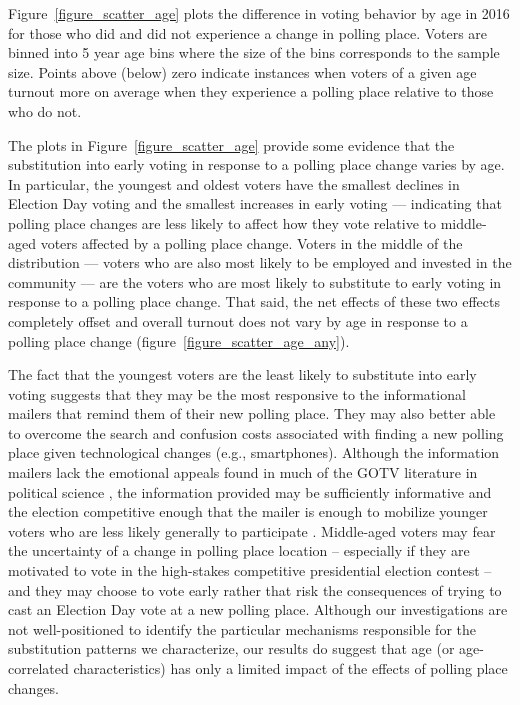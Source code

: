 \documentclass{cup_PSRM}
\begin{document}
Figure~\ref{figure_scatter_age} plots the difference in voting behavior by age in 2016 for those who did and did not experience a change in polling place.   Voters are binned into 5 year age bins where the size of the bins corresponds to the sample size.  Points above (below) zero indicate instances when voters of a given age turnout more on average when they experience a polling place relative to those who do not.

The plots in Figure~\ref{figure_scatter_age} provide some evidence that the substitution into early voting in response to a polling place change varies by age.  In particular, the youngest and oldest voters have the smallest declines in Election Day voting and the smallest increases in early voting --- indicating that polling place changes are less likely to affect how they vote relative to middle-aged voters affected by a polling place change.  Voters in the middle of the distribution --- voters who are also most likely to be employed and invested in the community --- are the voters who are most likely to substitute to early voting in response to a polling place change. That said, the net effects of these two effects completely offset and overall turnout does not vary by age in response to a polling place change (figure~\ref{figure_scatter_age_any}).


The fact that the youngest voters are the least likely to substitute into early voting suggests that they may be the most responsive to the informational mailers that remind them of their new polling place.  They may also better able to overcome the search and confusion costs associated with finding a new polling place given technological changes (e.g., smartphones).  Although the information mailers lack the emotional appeals found in much of the GOTV literature in political science \citep{gerber2017generalizability, gerber2008social}, the information provided may be sufficiently informative and the election competitive enough that the mailer is enough to mobilize younger voters who are less likely generally to participate \citep{arceneaux2009mobilized}.  Middle-aged voters may fear the uncertainty of a change in polling place location -- especially if they are motivated to vote in the high-stakes competitive presidential election contest -- and they may choose to vote early rather that risk the consequences of trying to cast an Election Day vote at a new polling place.  Although our investigations are not well-positioned to identify the particular mechanisms responsible for the substitution patterns we characterize, our results do suggest that age (or age-correlated characteristics) has only a limited impact of the effects of polling place changes.
\end{document}

